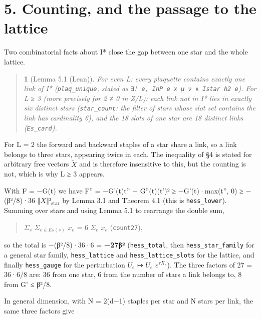 \documentclass[11pt,a4paper]{article}
\theoremstyle{named}
\newtheorem*{namedthm}{}
\begin{document}
\section*{5. Counting, and the passage to the lattice}
Two combinatorial facts about I* close the gap between one star and the whole lattice.

\begin{quote}
\begin{namedthm}[Lemma 5.1 (Lean)]
For even L: every plaquette contains exactly one link of I* (\texttt{plaq\_\allowbreak{}unique}, stated as \texttt{∃!\ \allowbreak{}e,\ \allowbreak{}InP\ \allowbreak{}e\ \allowbreak{}x\ \allowbreak{}μ\ \allowbreak{}ν\ \allowbreak{}∧\ \allowbreak{}Istar\ \allowbreak{}h2\ \allowbreak{}e}). For L ≥ 3 (more precisely for 2 ≠ 0 in Z/L): each link not in I* lies in exactly six distinct stars (\texttt{star\_\allowbreak{}count}: the filter of stars whose slot set contains the link has cardinality 6), and the 18 slots of one star are 18 distinct links (\texttt{Es\_\allowbreak{}card}).
\end{namedthm}
\end{quote}
For L = 2 the forward and backward staples of a star share a link, so a link belongs to three stars, appearing twice in each. The inequality of §4 is stated for arbitrary free vectors $\tilde{X}$ and is therefore insensitive to this, but the counting is not, which is why L ≥ 3 appears.

With F = −G(t) we have F'' = −G'(t)t'' − G''(t)(t')² ≥ −G'(t)·max(t'', 0) ≥ −(β²/8)·36 $‖X‖²_{\mathrm{star}}$ by Lemma 3.1 and Theorem 4.1 (this is \texttt{hess\_\allowbreak{}lower}). Summing over stars and using Lemma 5.1 to rearrange the double sum,

\begin{quote}
$Σ_s$ $Σ_{e ∈ Es(s)}$ $x_e$ = 6 $Σ_e$ $x_e$   (\texttt{count27}),
\end{quote}
so the total is −(β²/8)·36·6 = \textbf{−27β²} (\texttt{hess\_\allowbreak{}total}, then \texttt{hess\_\allowbreak{}star\_\allowbreak{}family} for a general star family, \texttt{hess\_\allowbreak{}lattice} and \texttt{hess\_\allowbreak{}lattice\_\allowbreak{}slots} for the lattice, and finally \texttt{hess\_\allowbreak{}gauge} for the perturbation $U_e$ ↦ $U_e$ $e^{τX_e}$). The three factors of 27 = 36·6/8 are: 36 from one star, 6 from the number of stars a link belongs to, 8 from G' ≤ β²/8.

In general dimension, with N = 2(d−1) staples per star and N stars per link, the same three factors give
\end{document}
